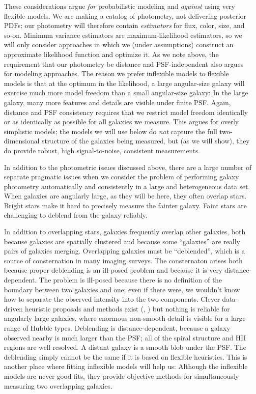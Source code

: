 \documentclass[12pt,preprint,pdftex]{aastex}
\begin{document}
These considerations argue \emph{for} probabilistic modeling and
\emph{against} using very flexible models.  We are making a catalog of
photometry, not delivering posterior PDFs; our photometry will
therefore contain \emph{estimators} for flux, color, size, and so-on.
Minimum variance estimators are maximum-likelihood estimators, so we
will only consider approaches in which we (under assumptions)
construct an approximate likelihood function and optimize it.  As we
note above, the requirement that our photometry be distance and
PSF-independent also argues for modeling approaches.  The reason we
prefer inflexible models to flexible models is that at the optimum in
the likelihood, a large angular-size galaxy will exercise much more
model freedom than a small angular-size galaxy: In the large galaxy,
many more features and details are visible under finite PSF.  Again,
distance and PSF consistency requires that we restrict model freedom
identically or as identically as possible for all galaxies we measure.
This argues for overly simplistic models; the models we will use below
do \emph{not} capture the full two-dimensional structure of the
galaxies being measured, but (as we will show), they do provide
robust, high signal-to-noise, consistent measurements.

In addition to the photometric issues discussed above, there are a
large number of separate pragmatic issues when we consider the problem
of performing galaxy photometry automatically and consistently in a
large and heterogeneous data set.  When galaxies are angularly large,
as they will be here, they often overlap stars.  Bright stars make it
hard to precisely measure the fainter galaxy.  Faint stars are
challenging to deblend from the galaxy reliably.

In addition to overlapping stars, galaxies frequently overlap other
galaxies, both because galaxies are spatially clustered and because
some ``galaxies'' are really pairs of galaxies merging.  Overlapping
galaxies must be ``deblended'', which is a source of consternation in
many imaging surveys.  The consternaton arises both because proper
deblending is an ill-posed problem and because it is very
distance-dependent.  The problem is ill-posed because there is no
definition of the boundary between two galaxies and one; even if there
were, we wouldn't know how to separate the observed intensity into the
two components.  Clever data-driven heuristic proposals and methods
exist (\cite{lupton}, \cite{sextractor}) but nothing is reliable for
angularly large galaxies, where enormous non-smooth detail is visible
for a large range of Hubble types.  Deblending is distance-dependent,
because a galaxy observed nearby is much larger than the PSF; all of
the spiral structure and HII regions are well resolved.  A distant
galaxy is a smooth blob under the PSF.  The deblending simply cannot be
the same if it is based on flexible heuristics.  This is another place
where fitting inflexible models will help us: Although the inflexible
models are never good fits, they provide objective methods for
simultaneously measuring two overlapping galaxies.
\end{document}
